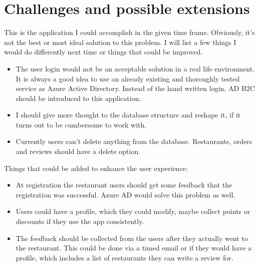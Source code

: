 \chapter{Challenges and possible extensions}\label{Ch5}

This is the application I could accomplish in the given time frame. Obviously, it's not the best or most ideal solution to this problem. I will list a few things I would do differently next time or things that could be improved.

\begin{itemize}
	\item The user login would not be an acceptable solution in a real life environment. It is always a good idea to use an already existing and thoroughly tested service as Azure Active Directory. Instead of the hand written login, AD B2C should be introduced to this application.
	
	\item I should give more thought to the database structure and reshape it, if it turns out to be cumbersome to work with.
	
	\item Currently users can't delete anything from the database. Restaurants, orders and reviews should have a delete option.
\end{itemize}

Things that could be added to enhance the user experience:

\begin{itemize}
	\item At registration the restaurant users should get some feedback that the registration was successful. Azure AD would solve this problem as well.
	
	\item Users could have a profile, which they could modify, maybe collect points or discounts if they use the app consistently.
	
	\item The feedback should be collected from the users after they actually went to the restaurant. This could be done via a timed email or if they would have a profile, which includes a list of restaurants they can write a review for.
\end{itemize}
